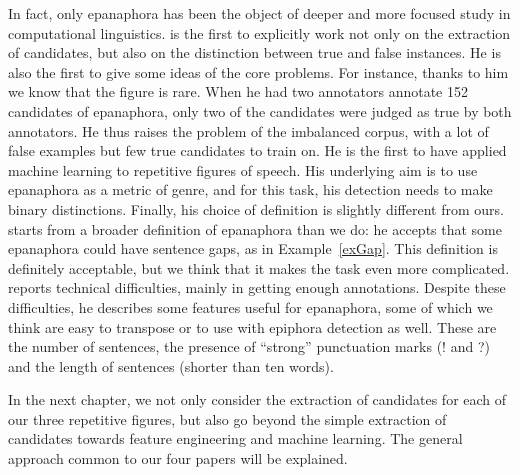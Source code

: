 %

In fact, only epanaphora has been the object of deeper and more focused study in computational linguistics. \cite{Strommer2011} is the first to explicitly work not only on the extraction of candidates, but also on the distinction between true and false instances. He is also the first to give some ideas of the core problems. For instance, thanks to him we know that the figure is rare. When he had two annotators annotate 152 candidates of epanaphora, only two of the candidates were judged as true by both annotators. He thus raises the problem of the imbalanced corpus, with a lot of false examples but few true candidates to train on. He is the first to have applied machine learning to repetitive figures of speech. His underlying aim is to use epanaphora as a metric of genre, and for this task, his detection needs to make binary distinctions. Finally, his choice of definition is slightly different from ours. \cite{Strommer2011} starts from a broader definition of epanaphora than we do: he accepts that some epanaphora could have sentence gaps, as in Example~\ref{exGap}.
%
%
%
\noindent
This definition is definitely acceptable, but we think that it makes the task even more complicated. \cite{Strommer2011} reports technical difficulties, mainly in getting enough annotations. %
Despite these difficulties, he describes some features useful for epanaphora, some of which we think are easy to transpose or to use with epiphora detection as well. %
These are the number of sentences, the presence of ``strong'' punctuation marks (! and ?) and the length of sentences (shorter than ten words). 

In the next chapter, we not only consider the extraction of candidates for each of our three repetitive figures, but also go beyond the simple extraction of candidates towards feature engineering and machine learning. The general approach common to our four papers will be explained.